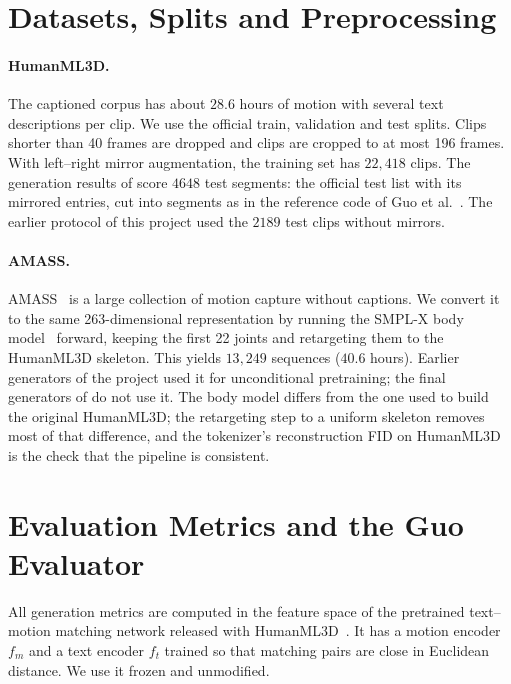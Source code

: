 \section{Datasets, Splits and Preprocessing}
\label{sec:protocol_data}

\paragraph{HumanML3D.} The captioned corpus has about $28.6$ hours of motion with several text descriptions per clip. We use the official train, validation and test splits. Clips shorter than 40 frames are dropped and clips are cropped to at most 196 frames. With left--right mirror augmentation, the training set has $22{,}418$ clips. The generation results of  score $4648$ test segments: the official test list with its mirrored entries, cut into segments as in the reference code of Guo et al.~\cite{guo2022humanml3d}. The earlier protocol of this project used the $2189$ test clips without mirrors.

\paragraph{AMASS.} AMASS~\cite{mahmood2019amass} is a large collection of motion capture without captions. We convert it to the same 263-dimensional representation by running the SMPL-X body model~\cite{pavlakos2019smplx} forward, keeping the first 22 joints and retargeting them to the HumanML3D skeleton. This yields $13{,}249$ sequences ($40.6$ hours). Earlier generators of the project used it for unconditional pretraining; the final generators of  do not use it. The body model differs from the one used to build the original HumanML3D; the retargeting step to a uniform skeleton removes most of that difference, and the tokenizer's reconstruction FID on HumanML3D is the check that the pipeline is consistent.

\section{Evaluation Metrics and the Guo Evaluator}
\label{sec:protocol_metrics}

All generation metrics are computed in the feature space of the pretrained text--motion matching network released with HumanML3D~\cite{guo2022humanml3d}. It has a motion encoder $f_m$ and a text encoder $f_t$ trained so that matching pairs are close in Euclidean distance. We use it frozen and unmodified.

